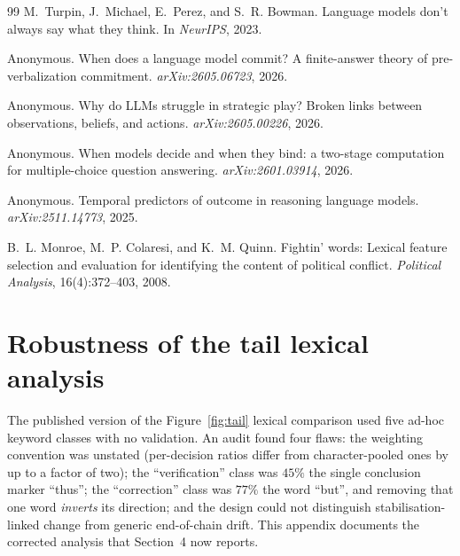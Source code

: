 \documentclass{article}
\begin{document}
\begin{thebibliography}{99}
M.~Turpin, J.~Michael, E.~Perez, and S.~R. Bowman.
\newblock Language models don't always say what they think.
\newblock In \emph{NeurIPS}, 2023.

Anonymous.
\newblock When does a language model commit? A finite-answer theory of pre-verbalization
commitment.
\newblock \emph{arXiv:2605.06723}, 2026.

Anonymous.
\newblock Why do LLMs struggle in strategic play? Broken links between observations,
beliefs, and actions.
\newblock \emph{arXiv:2605.00226}, 2026.

Anonymous.
\newblock When models decide and when they bind: a two-stage computation for
multiple-choice question answering.
\newblock \emph{arXiv:2601.03914}, 2026.

Anonymous.
\newblock Temporal predictors of outcome in reasoning language models.
\newblock \emph{arXiv:2511.14773}, 2025.

B.~L. Monroe, M.~P. Colaresi, and K.~M. Quinn.
\newblock Fightin' words: Lexical feature selection and evaluation for
  identifying the content of political conflict.
\newblock \emph{Political Analysis}, 16(4):372--403, 2008.

\end{thebibliography}

\appendix

\section{Robustness of the tail lexical analysis}
\label{app:lexicon}

The published version of the Figure~\ref{fig:tail} lexical comparison used five ad-hoc
keyword classes with no validation. An audit found four flaws: the weighting convention
was unstated (per-decision ratios differ from character-pooled ones by up to a factor of
two); the ``verification'' class was $45\%$ the single conclusion marker ``thus''; the
``correction'' class was $77\%$ the word ``but'', and removing that one word
\emph{inverts} its direction; and the design could not distinguish
stabilisation-linked change from generic end-of-chain drift. This appendix documents the
corrected analysis that Section~4 now reports.
\end{document}
